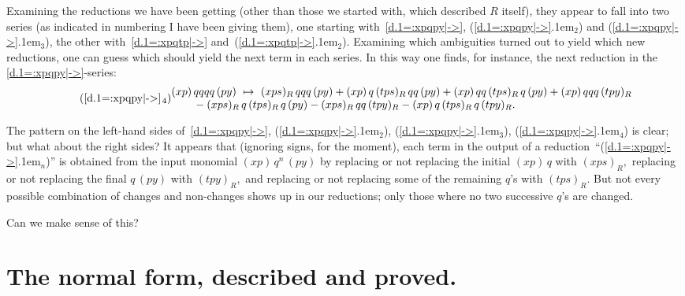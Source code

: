 \documentclass{amsart}
\begin{document}
Examining the reductions we have been getting (other than
those we started with, which described $R$ itself), they
appear to fall into two series (as indicated in
numbering I have been giving them),
one starting with~\eqref{d.1=:xpqpy|->}, ({{\setlength{\mathsurround}{0em}\ref{d.1=:xpqpy|->}\kern.1em$_{{2}}$}}) and
({{\setlength{\mathsurround}{0em}\ref{d.1=:xpqpy|->}\kern.1em$_{{3}}$}}), the other with~\eqref{d.1=:xpqtp|->} and~({{\setlength{\mathsurround}{0em}\ref{d.1=:xpqtp|->}\kern.1em$_{{2}}$}}).
Examining which ambiguities turned out to yield which new
reductions, one can guess which should yield the
next term in each series.
In this way one finds, for instance, the next reduction
in the \eqref{d.1=:xpqpy|->}-series:
\begin{equation}\tag{{{\setlength{\mathsurround}{0em}\ref{d.1=:xpqpy|->}\kern.1em$_{{4}}$}}}\begin{minipage}[c]{35pc}
$(xp)\,qqqq\,(py)\ \mapsto\ (xps)_R\,qqq\,(py) +
(xp)\,q\,(tps)_R\,qq\,(py) + (xp)\,qq\,(tps)_R\,q\,(py)
+ (xp)\,qqq\,(tpy)_R\\
\hspace*{2em}- (xps)_R\,q\,(tps)_R\,q\,(py)
- (xps)_R\,qq\,(tpy)_R - (xp)\,q\,(tps)_R\,q\,(tpy)_R.$
\end{minipage}\end{equation}

The pattern on the left-hand sides of~\eqref{d.1=:xpqpy|->}, ({{\setlength{\mathsurround}{0em}\ref{d.1=:xpqpy|->}\kern.1em$_{{2}}$}}),
({{\setlength{\mathsurround}{0em}\ref{d.1=:xpqpy|->}\kern.1em$_{{3}}$}}), ({{\setlength{\mathsurround}{0em}\ref{d.1=:xpqpy|->}\kern.1em$_{{4}}$}}) is clear; but what about the right sides?
It appears that (ignoring signs, for the
moment), each term in the output of a reduction~``({{\setlength{\mathsurround}{0em}\ref{d.1=:xpqpy|->}\kern.1em$_{{n}}$}})'' is
obtained from the input monomial $(xp)\,q^n\,(py)$ by
replacing or not replacing the initial $(xp)\,q$ with $(xps)_R,$
replacing or not replacing the final $q\,(py)$ with $(tpy)_R,$ and
replacing or not replacing some of the remaining $\!q\!$'s
with $(tps)_R.$
But not every possible combination
of changes and non-changes shows up in our reductions; only
those where no two successive $\!q\!$'s are changed.

Can we make sense of this?

\section{The normal form, described and proved.}\label{S.1=:norm}
\end{document}
